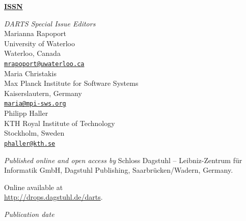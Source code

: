 \documentclass[a4paper,UKenglish]{dartsmaster}
\begin{document}
\frontmatter


\maketitle


\begin{publicationinfo}%
\sffamily
\twocolumn

{\Large\bf\sffamily \textbf{\href{http://www.dagstuhl.de/lites}{ISSN \printISSN{}}}}

\bigskip

\newcommand{\orcid}[1]{\url{http://orcid.org/#1}}
\newcommand{\email}[1]{\href{mailto:#1}{\texttt{#1}}}

\emph{DARTS Special Issue Editors} \\[0.2cm]
Marianna Rapoport\\
University of Waterloo\\
Waterloo, Canada\\
\email{mrapoport@uwaterloo.ca}\\

Maria Christakis \\
Max Planck Institute for Software Systems \\
Kaiserslautern, Germany\\ 
\email{maria@mpi-sws.org}\\

Philipp Haller\\
KTH Royal Institute of Technology\\
Stockholm, Sweden\\ 
\email{phaller@kth.se}

\bigskip

\emph{Published online and open access by}\newline
Schloss Dagstuhl -- Leibniz-Zentrum f\"ur Informatik GmbH, Dagstuhl Publishing, Saarbr\"ucken/Wadern, Germany. 

Online available at \\ \url{http://drops.dagstuhl.de/darts}.

\bigskip
\emph{Publication date}\newline
\printDatePublished{}



\bigskip



\end{publicationinfo}
\end{document}

